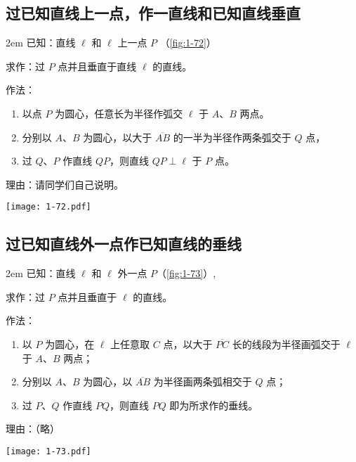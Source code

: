 \subsection{过已知直线上一点，作一直线和已知直线垂直}
\noindent
\begin{minipage}{0.68\linewidth}\parindent2em
已知：直线 $\ell$ 和 $\ell$ 上一点 $P$ （\cref{fig:1-72}）

求作：过 $P$ 点并且垂直于直线 $\ell$ 的直线。

作法：
\begin{enumerate}
	\item 以点 $P$ 为圆心，任意长为半径作弧交 $\ell$ 于 $A$、$B$ 两点。
	\item 分别以 $A$、$B$ 为圆心，以大于 $\overline{AB}$ 的一半为半径作两条弧交于 $Q$ 点，
	\item 过 $Q$、$P$ 作直线 $QP$，则直线 $QP\perp\ell$ 于 $P$ 点。
\end{enumerate}

理由：请同学们自己说明。
\end{minipage}\hfill
\begin{minipage}{0.3\linewidth}\centering
	\texttt{[image: 1-72.pdf]}
	\label{fig:1-72}
\end{minipage}

\subsection{过已知直线外一点作已知直线的垂线}
\noindent
\begin{minipage}{0.74\linewidth}\parindent2em
已知：直线 $\ell$ 和 $\ell$ 外一点 $P$（\cref{fig:1-73}）,

求作：过 $P$ 点并且垂直于 $\ell$ 的直线。

作法：
\begin{enumerate}
	\item 以 $P$ 为圆心，在 $\ell$ 上任意取 $C$ 点，以大于 $\overline{PC}$ 长的线段为半径画弧交于 $\ell$ 于 $A$、$B$ 两点；
	\item 分别以 $A$、$B$ 为圆心，以 $\overline{AB}$ 为半径画两条弧相交于 $Q$ 点；
	\item 过 $P$、$Q$ 作直线 $PQ$，则直线 $PQ$ 即为所求作的垂线。
\end{enumerate}

理由：（略）
\end{minipage}\hfill
\begin{minipage}{0.25\linewidth}\centering
	\texttt{[image: 1-73.pdf]}
	\label{fig:1-73}
\end{minipage}



